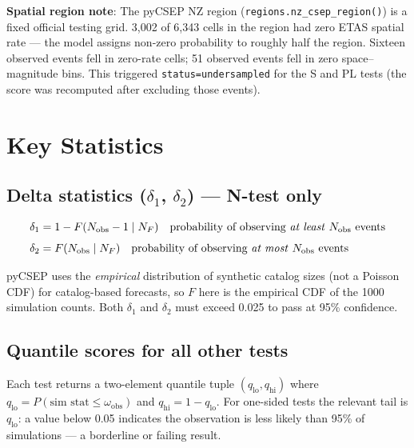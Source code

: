 \documentclass[12pt,a4paper]{article}
\begin{document}
\textbf{Spatial region note}: The pyCSEP NZ region
(\texttt{regions.nz\_csep\_region()}) is a fixed official testing grid.
3{,}002 of 6{,}343 cells in the region had zero ETAS spatial rate --- the model
assigns non-zero probability to roughly half the region. Sixteen observed
events fell in zero-rate cells; 51 observed events fell in zero
space--magnitude bins. This triggered \texttt{status=undersampled} for the S
and PL tests (the score was recomputed after excluding those events).

\section{Key Statistics}

\subsection{Delta statistics ($\delta_1$, $\delta_2$) --- N-test only}

\begin{align}
    \delta_1 &= 1 - F(N_\text{obs} - 1 \mid N_F)
               \quad \text{probability of observing \emph{at least} $N_\text{obs}$ events} \\[4pt]
    \delta_2 &= F(N_\text{obs} \mid N_F)
               \quad \text{probability of observing \emph{at most} $N_\text{obs}$ events}
\end{align}

pyCSEP uses the \emph{empirical} distribution of synthetic catalog sizes (not
a Poisson CDF) for catalog-based forecasts, so $F$ here is the empirical CDF
of the 1000 simulation counts. Both $\delta_1$ and $\delta_2$ must exceed
0.025 to pass at 95\% confidence.

\subsection{Quantile scores for all other tests}

Each test returns a two-element quantile tuple $(q_\text{lo}, q_\text{hi})$
where $q_\text{lo} = P(\text{sim stat} \leq \omega_\text{obs})$ and
$q_\text{hi} = 1 - q_\text{lo}$. For one-sided tests the relevant tail is
$q_\text{lo}$: a value below 0.05 indicates the observation is less likely
than 95\% of simulations --- a borderline or failing result.

\end{document}
